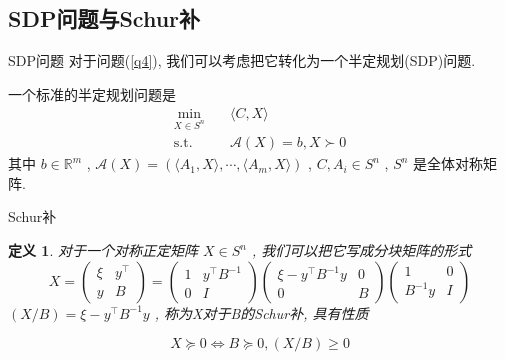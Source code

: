 \documentclass[slidestop,compress,mathserif,UTF8]{beamer}
\newtheorem{define}{\bf \textcolor[rgb]{0.8,0,0}{定义}}[section]
\numberwithin{equation}{section}
\begin{document}
        \subsection{SDP问题与Schur补}
            \begin{frame}[t]{SDP问题}
                对于问题(\ref{q4}), 我们可以考虑把它转化为一个半定规划(SDP)问题.

                一个标准的半定规划问题是
                \begin{equation}
                    \begin{split}\label{SDP}
                        \min_{X \in S^n} \quad
                            & \langle{C, X}\rangle\\
                        \text{s.t.} \quad
                            & \mathcal{A}(X) = b, X \succ 0
                    \end{split}
                \end{equation}
                \small{其中 $b \in \mathbb{R}^{m}$ , $\mathcal{A}(X) = (\langle{A_1, X}\rangle, \cdots, \langle{A_m, X}\rangle)$ , $C, A_i \in S^n$ , $S^n$ 是全体对称矩阵.}\normalsize
            \end{frame}
            \begin{frame}[t]{Schur补}
                \begin{define}
                    对于一个对称正定矩阵 $X \in S^n$ , 我们可以把它写成分块矩阵的形式
                    \begin{equation}
                            X
                        =	\begin{pmatrix}
                                \xi & y^\top \\
                                y & B
                            \end{pmatrix}
                        =	\begin{pmatrix}
                                1 & y^\top B^{-1} \\
                                0 & I
                            \end{pmatrix}
                            \begin{pmatrix}
                                \xi - y^\top B^{-1} y & 0 \\
                                0 & B
                            \end{pmatrix}
                            \begin{pmatrix}
                                1 & 0 \\
                                B^{-1} y & I
                            \end{pmatrix}
                    \end{equation}
                    $(X/B) = \xi - y^\top B^{-1} y$ , 称为X对于B的Schur补, 具有性质

                    \begin{equation}\label{SchurCondition}
                        X \succeq 0 \Leftrightarrow B \succeq 0, (X/B) \geq 0
                    \end{equation}
                \end{define}
            \end{frame}
\end{document}
